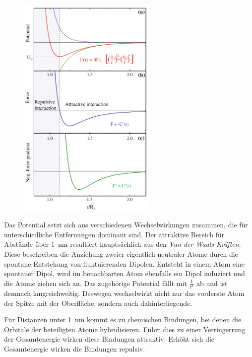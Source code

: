         \begin{figure}[h]
          \centering
          \includegraphics[width = 0.6\textwidth]{pictures/LJ.png}
          \caption{}
          \label{fig:LJ}
        \end{figure}

        \FloatBarrier

        Das Potential setzt sich aus verschiedenen Wechselwirkungen zusammen, die für unterschiedliche Entfernungen dominant sind.\newline 
        Der attraktive Bereich für Abstände über \SI{1}{\nano\metre} resultiert hauptsächlich aus den \textit{Van-der-Waals-Kräften}. Diese beschreiben die Anziehung zweier eigentlich neutraler Atome durch die 
        spontane Entstehung von fluktuierenden Dipolen. Entsteht in einem Atom eine 
        spontaner Dipol, wird im benachbarten Atom ebenfalls ein Dipol induziert und die Atome ziehen sich an. Das zugehörige Potential fällt mit $\frac{1}{\text{r}^6}$ ab und ist demnach langreichweitig. 
        Deswegen wechselwirkt nicht nur das vorderste Atom der Spitze mit der Oberfläche, sondern auch dahinterliegende.\newline

        Für Distanzen unter \SI{1}{\nano\metre} kommt es zu chemischen Bindungen, bei denen die Orbitale der beteiligten Atome hybridisieren. Führt dies zu einer Verringerrung der Gesamtenergie wirken diese 
        Bindungen attraktiv. Erhöht sich die Gesamtenergie wirken die Bindungen repulsiv.

